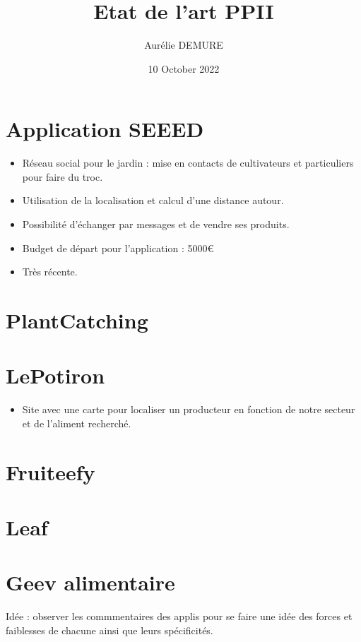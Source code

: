 \documentclass{article}
\title{Etat de l'art PPII}
\author{Aurélie DEMURE}
\date{10 October 2022}
\begin{document}
\maketitle

\section{Application SEEED}
\begin{itemize}
    \item Réseau social pour le jardin : mise en contacts de cultivateurs
    et particuliers pour faire du troc. 
    \item Utilisation de la localisation et calcul d'une distance autour.
    \item Possibilité d'échanger par messages et de vendre ses produits.
    \item Budget de départ pour l'application : 5000€
    \item Très récente.
\end{itemize}

\section{PlantCatching}

\section{LePotiron} 
\begin{itemize}
    \item Site avec une carte pour localiser un producteur en fonction de 
    notre secteur et de l'aliment recherché.
\end{itemize}

\section{Fruiteefy}

\section{Leaf}

\section{Geev alimentaire}

Idée : observer les commmentaires des applis pour se faire une idée des 
forces et faiblesses de chacune ainsi que leurs spécificités.
\end{document}
